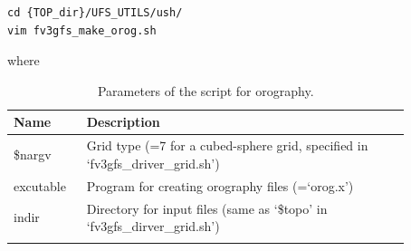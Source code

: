 \documentclass[11pt,fleqn]{report}              %
\begin{document}
\lstset{language=bash}   
\begin{lstlisting}[frame=trBL]
cd {TOP_dir}/UFS_UTILS/ush/
vim fv3gfs_make_orog.sh
\end{lstlisting}
where
{
\fontsize{10}{12}\selectfont
\begin{longtable}{p{0.15\linewidth} | p{0.72\linewidth} }
\hline
\hline
Name & Description \\
\hline
 \$nargv & Grid type (=7 for a cubed-sphere grid, specified in `fv3gfs\_driver\_grid.sh') \\
 excutable & Program for creating orography files (=`orog.x') \\
 indir & Directory for input files (same as `\$topo' in `fv3gfs\_dirver\_grid.sh') \\
\hline
\caption{Parameters of the script for orography.}
\label{table:var_oro_sh}
\end{longtable}
}
\end{document}

